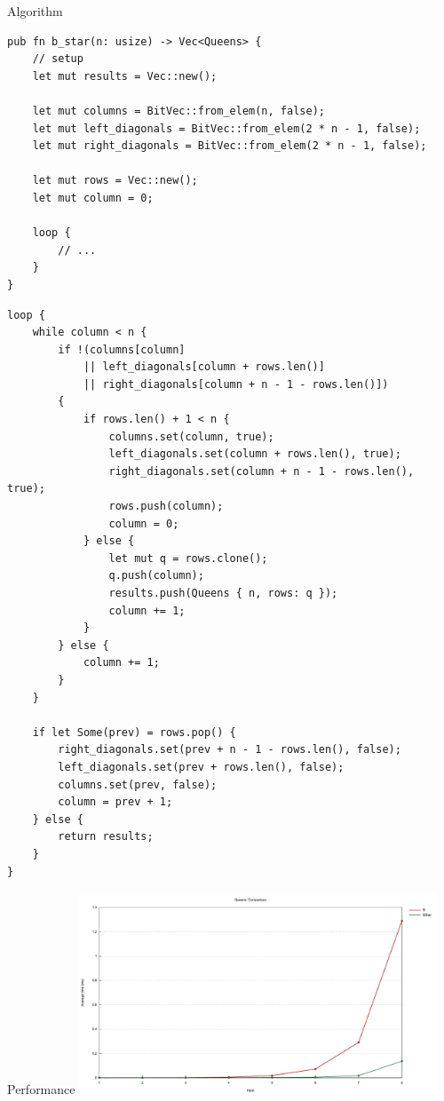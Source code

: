 \documentclass[aspectratio=43,t]{beamer}
\begin{document}
    \begin{frame}[fragile]{Algorithm}
      \begin{verbatim}
pub fn b_star(n: usize) -> Vec<Queens> {
    // setup
    let mut results = Vec::new();

    let mut columns = BitVec::from_elem(n, false);
    let mut left_diagonals = BitVec::from_elem(2 * n - 1, false);
    let mut right_diagonals = BitVec::from_elem(2 * n - 1, false);

    let mut rows = Vec::new();
    let mut column = 0;

    loop {
        // ...
    }
}     
        \end{verbatim}
    \end{frame}
  \begin{frame}[fragile]
    \begin{verbatim}
loop {
    while column < n {
        if !(columns[column]
            || left_diagonals[column + rows.len()]
            || right_diagonals[column + n - 1 - rows.len()])
        {
            if rows.len() + 1 < n {
                columns.set(column, true);
                left_diagonals.set(column + rows.len(), true);
                right_diagonals.set(column + n - 1 - rows.len(), true);
                rows.push(column);
                column = 0;
            } else {
                let mut q = rows.clone();
                q.push(column);
                results.push(Queens { n, rows: q });
                column += 1;
            }
        } else {
            column += 1;
        }
    }

    if let Some(prev) = rows.pop() {
        right_diagonals.set(prev + n - 1 - rows.len(), false);
        left_diagonals.set(prev + rows.len(), false);
        columns.set(prev, false);
        column = prev + 1;
    } else {
        return results;
    }
}
      \end{verbatim}
  \end{frame}
  
  \begin{frame}[fragile]{Performance}
    \includegraphics[width=0.8\textwidth, clip]{../img/lines.pdf}
  \end{frame}
\end{document}
